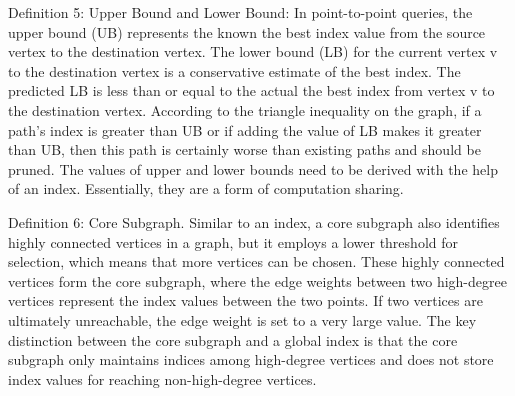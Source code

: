 \documentclass[lettersize,journal]{IEEEtran} %
\begin{document}
Definition 5: Upper Bound and Lower Bound: In point-to-point queries, the upper bound (UB) represents the known the best index value from the source vertex to the destination vertex. The lower bound (LB) for the current vertex v to the destination vertex is a conservative estimate of the best index. The predicted LB is less than or equal to the actual the best index from vertex v to the destination vertex. According to the triangle inequality on the graph, if a path's index is greater than UB or if adding the value of LB makes it greater than UB, then this path is certainly worse than existing paths and should be pruned. The values of upper and lower bounds need to be derived with the help of an index. Essentially, they are a form of computation sharing.

Definition 6: Core Subgraph. Similar to an index, a core subgraph also identifies highly connected vertices in a graph, but it employs a lower threshold for selection, which means that more vertices can be chosen. These highly connected vertices form the core subgraph, where the edge weights between two high-degree vertices represent the index values between the two points. If two vertices are ultimately unreachable, the edge weight is set to a very large value. The key distinction between the core subgraph and a global index is that the core subgraph only maintains indices among high-degree vertices and does not store index values for reaching non-high-degree vertices.
\end{document}
